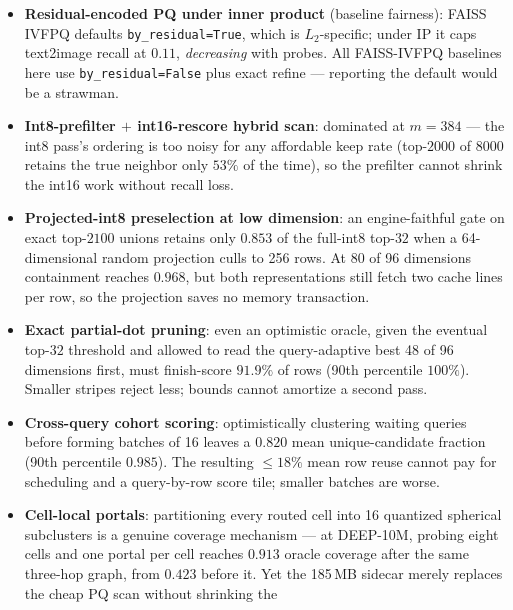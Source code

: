 \documentclass{article}
\begin{document}
\begin{itemize}
    The same holds for \emph{raw-basis} routing-dimension truncation
    in-distribution (Cohere-768: scoring a 384-dim prefix costs $1.6$ recall
    points) --- prefix truncation needs a variance-ordering rotation to be
    principled, in either regime.
  \item \textbf{Residual-encoded PQ under inner product} (baseline fairness):
    FAISS IVFPQ defaults \texttt{by\_residual=True}, which is $L_2$-specific; under
    IP it caps text2image recall at $0.11$, \emph{decreasing} with probes. All
    FAISS-IVFPQ baselines here use \texttt{by\_residual=False} plus exact refine
    --- reporting the default would be a strawman.
  \item \textbf{Int8-prefilter $+$ int16-rescore hybrid scan}: dominated at
    $m{=}384$ --- the int8 pass's ordering is too noisy for any affordable keep
    rate (top-$2000$ of $8000$ retains the true neighbor only $53\%$ of the time),
    so the prefilter cannot shrink the int16 work without recall loss.
  \item \textbf{Projected-int8 preselection at low dimension}: an engine-faithful
    gate on exact top-$2100$ unions retains only $0.853$ of the full-int8 top-$32$
    when a 64-dimensional random projection culls to 256 rows. At 80 of 96
    dimensions containment reaches $0.968$, but both representations still fetch
    two cache lines per row, so the projection saves no memory transaction.
  \item \textbf{Exact partial-dot pruning}: even an optimistic oracle, given the
    eventual top-$32$ threshold and allowed to read the query-adaptive best 48 of
    96 dimensions first, must finish-score $91.9\%$ of rows (90th percentile
    $100\%$). Smaller stripes reject less; bounds cannot amortize a second pass.
  \item \textbf{Cross-query cohort scoring}: optimistically clustering waiting
    queries before forming batches of 16 leaves a $0.820$ mean unique-candidate
    fraction (90th percentile $0.985$). The resulting ${\le}18\%$ mean row reuse
    cannot pay for scheduling and a query-by-row score tile; smaller batches are
    worse.
  \item \textbf{Cell-local portals}: partitioning every routed cell into 16
    quantized spherical subclusters is a genuine coverage mechanism --- at
    DEEP-10M, probing eight cells and one portal per cell reaches $0.913$ oracle
    coverage after the same three-hop graph, from $0.423$ before it. Yet the
    185\,MB sidecar merely replaces the cheap PQ scan without shrinking the

\end{itemize}
\end{document}
